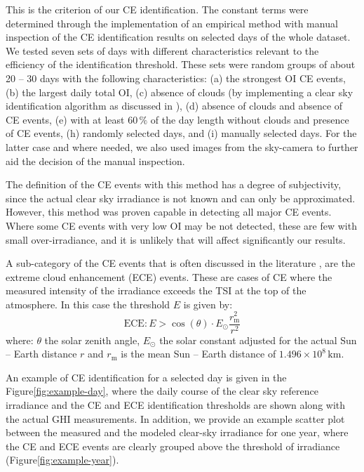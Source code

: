\documentclass[preprint, 5p,
authoryear]{elsarticle} %
\begin{document}
This is the criterion of our CE identification. The constant terms were
determined through the implementation of an empirical method with manual
inspection of the CE identification results on selected days of the
whole dataset. We tested seven sets of days with different
characteristics relevant to the efficiency of the identification
threshold. These sets were random groups of about 20 -- 30 days with the
following characteristics: (a) the strongest OI CE events, (b) the
largest daily total OI, (c) absence of clouds (by implementing a clear
sky identification algorithm as discussed in \citet{Natsis2023}), (d)
absence of clouds and absence of CE events, (e) with at least \(60\,\%\)
of the day length without clouds and presence of CE events, (h) randomly
selected days, and (i) manually selected days. For the latter case and
where needed, we also used images from the sky-camera to further aid the
decision of the manual inspection.

The definition of the CE events with this method has a degree of
subjectivity, since the actual clear sky irradiance is not known and can
only be approximated. However, this method was proven capable in
detecting all major CE events. Where some CE events with very low OI may
be not detected, these are few with small over-irradiance, and it is
unlikely that will affect significantly our results.

A sub-category of the CE events that is often discussed in the
literature \citep{Cordero2023, Martins2022, Yordanov2015}, are the
extreme cloud enhancement (ECE) events. These are cases of CE where the
measured intensity of the irradiance exceeds the TSI at the top of the
atmosphere. In this case the threshold \(E\) is given by:
\begin{equation}
\text{ECE}: E > \cos(\theta) \cdot E_{\odot} \frac{r^2_\text{m}} {r^2}
\label{eq:ECE}
\end{equation} where: \(\theta\) the solar zenith angle, \(E_{\odot}\)
the solar constant adjusted for the actual Sun -- Earth distance \(r\)
and \(r_\text{m}\) is the mean Sun -- Earth distance of
\(1.496\times10^8\,\text{km}\).

An example of CE identification for a selected day is given in the
Figure\nobreakspace{}\ref{fig:example-day}, where the daily course of
the clear sky reference irradiance and the CE and ECE identification
thresholds are shown along with the actual GHI measurements. In
addition, we provide an example scatter plot between the measured and
the modeled clear-sky irradiance for one year, where the CE and ECE
events are clearly grouped above the threshold of irradiance
(Figure\nobreakspace{}\ref{fig:example-year}).
\end{document}
